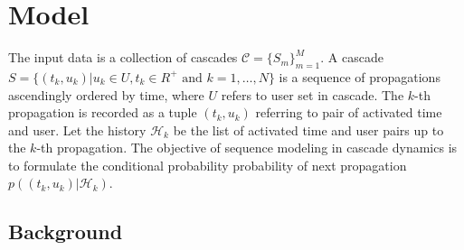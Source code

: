 \section{Model}

The input data is a collection of cascades $\mathcal{C}=\{S_m\}_{m=1}^M$. 
A cascade $S=\{(t_k, u_k)|u_k\in U, t_k\in R^+ \text{~and~}
k=1,\dots,N\}$ is a sequence of propagations ascendingly ordered by time, where $U$ refers to 
user set in cascade. The $k$-th propagation is recorded
as a tuple $(t_k, u_k)$ referring to pair of activated time and user.
Let the history $\mathcal{H}_k$ be the list of activated time and user pairs up
to the $k$-th propagation. The objective of sequence modeling in cascade dynamics is to
formulate the conditional probability probability of next propagation
$p((t_k, u_k)|\mathcal{H}_k)$.

\subsection{Background}

